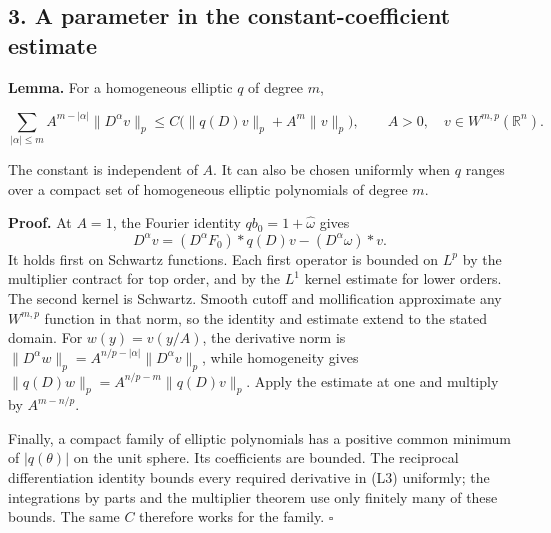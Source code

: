 \documentclass[
  11pt,
]{article}
\makeatletter
\let\ReaderOriginalAnchorStart\hyper@anchorstart
\let\ReaderOriginalAnchorEnd\hyper@anchorend
\let\ReaderPendingAliases\@empty
\def\ReaderArmAliases#1{\gdef\ReaderPendingAliases{#1}}
\def\hyper@anchorstart#1{\ReaderIfNativeAnchorTF{#1}{\ReaderPendingAliases\global\let\ReaderPendingAliases\@empty}{}\ReaderOriginalAnchorStart{#1}}
\makeatother
\begin{document}
\ReaderArmAliases{\ReaderOriginalAnchorStart{AN03-LCE-003}\ReaderOriginalAnchorEnd\begingroup\expandafter\def\csname @currentHref\endcsname{AN03-LCE-003}\label{AN03-LCE-003}\endgroup\ReaderOriginalAnchorStart{an03-lce-003-a-parameter-in-the-constant-coefficient-estimate}\ReaderOriginalAnchorEnd\begingroup\expandafter\def\csname @currentHref\endcsname{an03-lce-003-a-parameter-in-the-constant-coefficient-estimate}\label{an03-lce-003-a-parameter-in-the-constant-coefficient-estimate}\endgroup\ReaderOriginalAnchorStart{3-a-parameter-in-the-constant-coefficient-estimate}\ReaderOriginalAnchorEnd\begingroup\expandafter\def\csname @currentHref\endcsname{3-a-parameter-in-the-constant-coefficient-estimate}\label{3-a-parameter-in-the-constant-coefficient-estimate}\endgroup\ReaderOriginalAnchorStart{a-parameter-in-the-constant-coefficient-estimate}\ReaderOriginalAnchorEnd}
\subsection{3. A parameter in the constant-coefficient
estimate}\label{a-parameter-in-the-constant-coefficient-estimate}

\textbf{Lemma.} For a homogeneous elliptic \(q\) of degree \(m\),

\[
\sum_{|\alpha|\leq m} A^{m-|\alpha|}\|D^\alpha v\|_p
\leq C\bigl(\|q(D)v\|_p+A^m\|v\|_p\bigr),\qquad A>0,\quad
v\in W^{m,p}(\mathbb R^n).                                        \tag{L13}
\]

The constant is independent of \(A\). It can also be chosen uniformly
when \(q\) ranges over a compact set of homogeneous elliptic polynomials
of degree \(m\).

\textbf{Proof.} At \(A=1\), the Fourier identity
\(q b_0=1+\widehat\omega\) gives \[
D^\alpha v=(D^\alpha F_0)*q(D)v-(D^\alpha\omega)*v.                \tag{L14}
\] It holds first on Schwartz functions. Each first operator is bounded
on \(L^p\) by the multiplier contract for top order, and by the \(L^1\)
kernel estimate for lower orders. The second kernel is Schwartz. Smooth
cutoff and mollification approximate any \(W^{m,p}\) function in that
norm, so the identity and estimate extend to the stated domain. For
\(w(y)=v(y/A)\), the derivative norm is
\(\|D^\alpha w\|_p=A^{n/p-|\alpha|}\|D^\alpha v\|_p\), while homogeneity
gives \(\|q(D)w\|_p=A^{n/p-m}\|q(D)v\|_p\). Apply the estimate at one
and multiply by \(A^{m-n/p}\).

Finally, a compact family of elliptic polynomials has a positive common
minimum of \(|q(\theta)|\) on the unit sphere. Its coefficients are
bounded. The reciprocal differentiation identity bounds every required
derivative in (L3) uniformly; the integrations by parts and the
multiplier theorem use only finitely many of these bounds. The same
\(C\) therefore works for the family. \(\square\)
\end{document}

